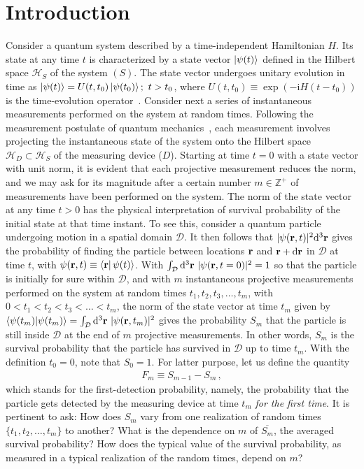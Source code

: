 \documentclass[12pt]{iopart}
\def\ra{\rangle}
\def\bra#1{\mathinner{\langle{#1}|}}
\def\ket#1{\mathinner{|{#1}\rangle}}
\newcommand{\im}{\mathrm{i}}
\begin{document}
\section{Introduction}
\label{sec:Introduction}

Consider a quantum system described by a time-independent Hamiltonian $H$.  Its state at any time $t$ is characterized by a state vector
$\ket{\psi(t)}$ defined in the Hilbert space $\mathcal{H}_S$ of the system $(S)$. The state vector undergoes unitary evolution in time as
$\ket{\psi(t)}=U(t,t_0)\ket{\psi(t_0)};~t>t_0$, where $U(t,t_0)\equiv
\exp(-\im H(t-t_0))$ is the time-evolution
operator~\cite{qua-note-hbar}. Consider
next a
series of instantaneous measurements performed on the system at random
times. Following the measurement postulate of quantum mechanics~\cite{Cohen}, each
measurement involves projecting the instantaneous state of the
system onto the Hilbert space $\mathcal{H}_D \subset \mathcal{H}_S$ of
the measuring device ($D$).
Starting at time $t=0$ with a state vector with unit norm, it is evident
that each projective measurement reduces the norm, and we may ask for its magnitude after a certain number $m \in \mathbb{Z}^+$ of measurements
have been performed on the system.  The norm of the state vector at any time $t>0$ has the physical
interpretation of survival probability of the initial state at that time
instant. To see this,  consider a quantum
particle undergoing motion in a spatial domain
$\mathcal{D}$.  It then follows that
$|\psi({\bf r},t)|^2 {\rm d}^3{\bf r}$ gives the probability of finding the particle between locations ${\bf r}$ and ${\bf r}+{\rm d}{\bf r}$ in $\mathcal{D}$ at
time $t$, with $\psi({\bf r},t)\equiv \bra{\bf r}\psi(t)\ra$. With
$\int_{\mathcal{D}}
{\rm d}^3{\bf r}~|\psi({\bf r},t=0)|^2=1$ so that the particle is
initially for sure within $\mathcal{D}$, and with $m$
instantaneous projective measurements
performed on the system at random times $t_1,t_2,t_3,\ldots,t_m$, with $0<t_1<t_2<t_3<\ldots<t_m$, the norm of the state vector at time $t_m$ given by $\langle \psi(t_m)|\psi(t_m)\rangle=
\int_{\mathcal{D}}
{\rm d}^3{\bf r}~|\psi({\bf r},t_m)|^2$ gives the
probability $S_m$ that the particle is still inside $\mathcal{D}$
at the end of $m$ projective measurements. In other words, $S_m$ is the survival probability that the
particle has survived in $\mathcal{D}$ up to time $t_m$.  With the definition $t_0=0$,  note that $S_0=1$.  For latter purpose,  let us define the quantity 
\begin{align}
F_m \equiv S_{m-1}-S_m\,,
\label{eq:Fm-definition}
\end{align}
which stands for the first-detection probability, namely, the probability that the particle gets detected by the measuring device at time $t_m$ \textit{for the first time}.  It is pertinent to ask: How does $S_m$
vary from one realization of random times $\{t_1,t_2,\ldots,t_m\}$ to
another? What is the dependence on $m$ of $\overline{S_m}$, the averaged survival
probability? How does the typical value of the survival probability, as measured in a typical realization of the random times, depend on $m$? 
\end{document}
